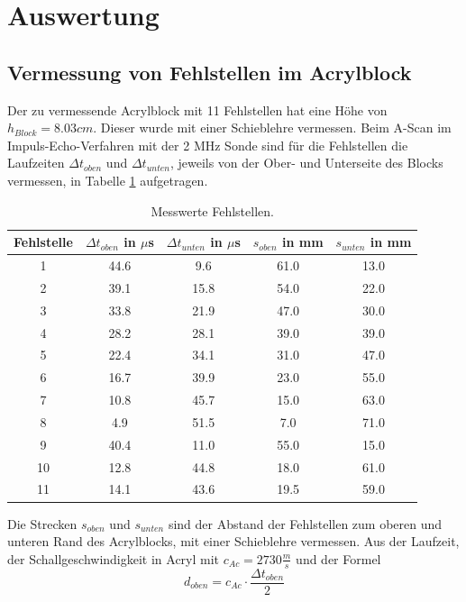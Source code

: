 \section{Auswertung}
\label{sec:Auswertung}

\subsection{Vermessung von Fehlstellen im Acrylblock}
\label{sec:fehlstelle}
Der zu vermessende Acrylblock mit 11 Fehlstellen hat eine Höhe von $h_{Block} = 8.03 cm$.
Dieser wurde mit einer Schieblehre vermessen.
Beim A-Scan im Impuls-Echo-Verfahren mit der 2 MHz Sonde sind für die Fehlstellen die Laufzeiten $\Delta t_{oben}$ und $\Delta t_{unten}$, jeweils von der Ober- und Unterseite des Blocks vermessen, in Tabelle \ref{tab:tab1} aufgetragen.
\begin{table}
  \centering
  \caption{Messwerte Fehlstellen.}
  \label{tab:tab1}
\begin{tabular}{c c c c c}
  \toprule
  Fehlstelle & $\Delta t_{oben}$ in $\mu$s & $\Delta t_{unten}$ in $\mu$s & $s_{oben}$ in mm & $s_{unten}$ in mm\\
  \midrule
  1  &  44.6  &  9.6  &  61.0  &  13.0  \\
  2  &  39.1  &  15.8  &  54.0  &  22.0  \\
  3  &  33.8  &  21.9  &  47.0  &  30.0  \\
  4  &  28.2  &  28.1  &  39.0  &  39.0  \\
  5  &  22.4  &  34.1  &  31.0  &  47.0  \\
  6  &  16.7  &  39.9  &  23.0  &  55.0  \\
  7  &  10.8  &  45.7  &  15.0  &  63.0  \\
  8  &  4.9  &  51.5  &  7.0  &  71.0  \\
  9  &  40.4  &  11.0  &  55.0  &  15.0  \\
  10  &  12.8  &  44.8  &  18.0  &  61.0  \\
  11  &  14.1  &  43.6  &  19.5  &  59.0  \\
  \bottomrule
\end{tabular}
\end{table}
\FloatBarrier
Die Strecken $s_{oben}$ und $s_{unten}$ sind der Abstand der Fehlstellen zum oberen und unteren Rand des Acrylblocks, mit einer Schieblehre vermessen.
Aus der Laufzeit, der Schallgeschwindigkeit in Acryl mit $c_{Ac} = 2730 \frac{m}{s}$ \cite{sample} und der Formel
\begin{equation}
  d_{oben} = c_{Ac} \cdot \frac{\Delta t_{oben}}{2}
  \label{eqn:glA1}
\end{equation}
